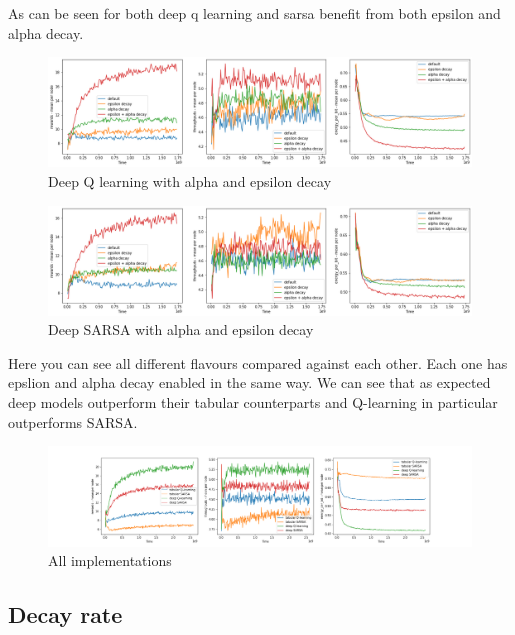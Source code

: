 As can be seen for both deep q learning and sarsa benefit from
both epsilon and alpha decay. 

\begin{figure}[H]
\centering
\hspace*{-1.1cm}  
\includegraphics[scale=0.40]{plots/decays/deep_q_decay_SMALL.png}
  \caption{Deep Q learning with alpha and epsilon decay}
\end{figure}

\begin{figure}[H]
\centering
\hspace*{-1.1cm}  
\includegraphics[scale=0.40]{plots/decays/deep_sarsa_decay_SMALL.png}
  \caption{Deep SARSA with alpha and epsilon decay}
\end{figure}

Here you can see all different flavours 
compared against each other. Each one 
has epslion and alpha decay enabled in the 
same way. We can see that as expected deep models outperform their tabular counterparts and Q-learning in particular outperforms SARSA.

\begin{figure}[H]
\centering
\hspace*{-3.3cm}  
\includegraphics[scale=0.40]{plots/decays/all_decay_SMALL.png}
  \caption{All implementations}
\end{figure}

\subsection{Decay rate}

